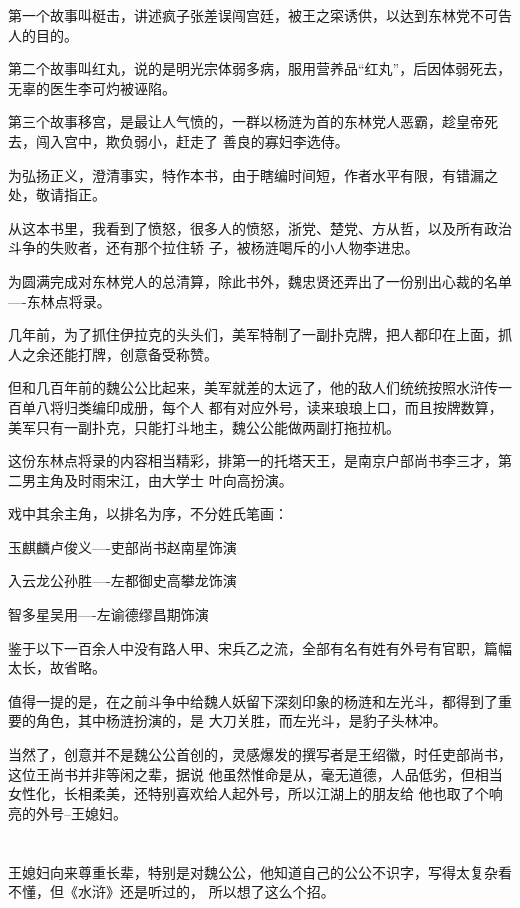 \documentclass[11pt,a4paper,onecolumn]{article}
\begin{document}
第一个故事叫梃击，讲述疯子张差误闯宫廷，被王之寀诱供，以达到东林党不可告人的目的。

第二个故事叫红丸，说的是明光宗体弱多病，服用营养品``红丸''，后因体弱死去，无辜的医生李可灼被诬陷。

第三个故事移宫，是最让人气愤的，一群以杨涟为首的东林党人恶霸，趁皇帝死去，闯入宫中，欺负弱小，赶走了
善良的寡妇李选侍。

为弘扬正义，澄清事实，特作本书，由于瞎编时间短，作者水平有限，有错漏之处，敬请指正。

从这本书里，我看到了愤怒，很多人的愤怒，浙党、楚党、方从哲，以及所有政治斗争的失败者，还有那个拉住轿
子，被杨涟喝斥的小人物李进忠。

为圆满完成对东林党人的总清算，除此书外，魏忠贤还弄出了一份别出心裁的名单----东林点将录。

几年前，为了抓住伊拉克的头头们，美军特制了一副扑克牌，把人都印在上面，抓人之余还能打牌，创意备受称赞。

但和几百年前的魏公公比起来，美军就差的太远了，他的敌人们统统按照水浒传一百单八将归类编印成册，每个人
都有对应外号，读来琅琅上口，而且按牌数算，美军只有一副扑克，只能打斗地主，魏公公能做两副打拖拉机。

这份东林点将录的内容相当精彩，排第一的托塔天王，是南京户部尚书李三才，第二男主角及时雨宋江，由大学士
叶向高扮演。

戏中其余主角，以排名为序，不分姓氏笔画：

玉麒麟卢俊义----吏部尚书赵南星饰演

入云龙公孙胜----左都御史高攀龙饰演

智多星吴用----左谕德缪昌期饰演

鉴于以下一百余人中没有路人甲、宋兵乙之流，全部有名有姓有外号有官职，篇幅太长，故省略。

值得一提的是，在之前斗争中给魏人妖留下深刻印象的杨涟和左光斗，都得到了重要的角色，其中杨涟扮演的，是
大刀关胜，而左光斗，是豹子头林冲。

当然了，创意并不是魏公公首创的，灵感爆发的撰写者是王绍徽，时任吏部尚书，这位王尚书并非等闲之辈，据说
他虽然惟命是从，毫无道德，人品低劣，但相当女性化，长相柔美，还特别喜欢给人起外号，所以江湖上的朋友给
他也取了个响亮的外号--王媳妇。

\section[\thesection]{}

王媳妇向来尊重长辈，特别是对魏公公，他知道自己的公公不识字，写得太复杂看不懂，但《水浒》还是听过的，
所以想了这么个招。
\end{document}
